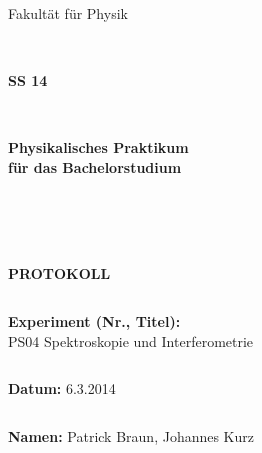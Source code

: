 \documentclass[12pt,a4paper]{article}
\begin{document}
\thispagestyle{empty}
			\begin{center}
			\Large{Fakultät für Physik}\\
			\end{center}
\begin{verbatim}


\end{verbatim}
			\begin{center}
			\textbf{\LARGE SS 14}
			\end{center}
\begin{verbatim}


\end{verbatim}
			\begin{center}
			\textbf{\LARGE{Physikalisches Praktikum\\ für das Bachelorstudium}}
			\end{center}
\begin{verbatim}




\end{verbatim}

			\begin{center}
			\textbf{\LARGE{PROTOKOLL}}
			\end{center}
			
\begin{verbatim}

\end{verbatim}

			\begin{flushleft}
			\textbf{\Large{Experiment (Nr., Titel):}}\\
			\LARGE{PS04 Spektroskopie und Interferometrie}	
			\end{flushleft}

\begin{verbatim}

\end{verbatim}	
			\begin{flushleft}
			\textbf{\Large{Datum:}} \Large{6.3.2014}
			\end{flushleft}
			
\begin{verbatim}
\end{verbatim}
		\begin{flushleft}
			\textbf{\Large{Namen:}} \Large{Patrick Braun, Johannes Kurz}
			\end{flushleft}
\end{document}
